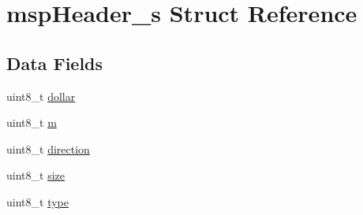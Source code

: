 \hypertarget{structmspHeader__s}{\section{msp\+Header\+\_\+s Struct Reference}
\label{structmspHeader__s}
}
\subsection*{Data Fields}
\begin{DoxyCompactItemize}
\item 
uint8\+\_\+t \hyperlink{structmspHeader__s_a97acab9a44765c5c59073e4411ba34e8}{dollar}
\item 
uint8\+\_\+t \hyperlink{structmspHeader__s_a8915b16f59d6f845def50ef343cd68e1}{m}
\item 
uint8\+\_\+t \hyperlink{structmspHeader__s_aa19d751542aded63cc57d54fbe58b0cf}{direction}
\item 
uint8\+\_\+t \hyperlink{structmspHeader__s_a087b28e55d51c726ecb21f372adb7311}{size}
\item 
uint8\+\_\+t \hyperlink{structmspHeader__s_a46e4a915f89187c3304b9d50dfd094c0}{type}
\end{DoxyCompactItemize}


